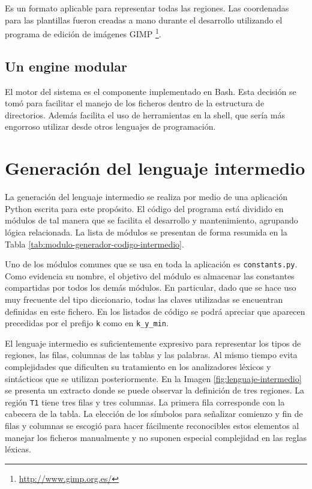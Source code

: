 Es un formato aplicable para representar todas las regiones. Las coordenadas para las plantillas fueron creadas a mano durante el desarrollo utilizando el programa de edición de imágenes GIMP \footnote{\url{http://www.gimp.org.es/}}.

\subsection{Un engine modular}


El motor del sistema es el componente implementado en Bash. Esta decisión se tomó para facilitar el manejo de los ficheros dentro de la estructura de directorios. Además facilita el uso de herramientas en la shell, que sería más engorroso utilizar desde otros lenguajes de programación. 

\section{Generación del lenguaje intermedio}

La generación del lenguaje intermedio se realiza por medio de una aplicación Python escrita para este propósito. El código del programa está dividido en módulos de tal manera que se facilita el desarrollo y mantenimiento, agrupando lógica relacionada. La lista de módulos se presentan de forma resumida en la Tabla \ref{tab:modulo-generador-codigo-intermedio}.

Uno de los módulos comunes que se usa en toda la aplicación es \verb|constants.py|. Como evidencia su nombre, el objetivo del módulo es almacenar las constantes compartidas por todos los demás módulos. En particular, dado que se hace uso muy frecuente del tipo diccionario, todas las claves utilizadas se encuentran definidas en este fichero. En los listados de código se podrá apreciar que aparecen precedidas por el prefijo \verb|k| como en \verb|k_y_min|.

El lenguaje intermedio es suficientemente expresivo para representar los tipos de regiones, las filas, columnas de las tablas y las palabras. Al mismo tiempo evita complejidades que dificulten su tratamiento en los analizadores léxicos y sintácticos que se utilizan posteriormente. En la Imagen \ref{fig:lenguaje-intermedio} se presenta un extracto donde se puede observar la definición de tres regiones. La región \verb|T1| tiene tres filas y tres columnas. La primera fila corresponde con la cabecera de la tabla. La elección de los símbolos para señalizar comienzo y fin de filas y columnas se escogió para hacer fácilmente reconocibles estos elementos al manejar los ficheros manualmente y no suponen especial complejidad en las reglas léxicas.

